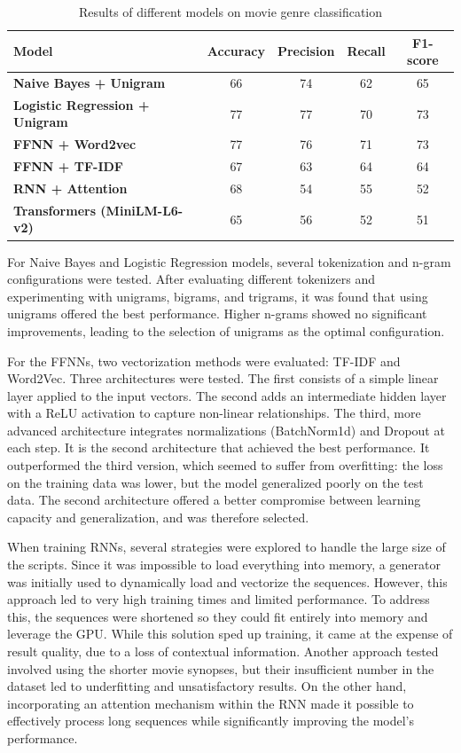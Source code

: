 \documentclass[12pt]{report}
\begin{document}
\begin{table}[H]
\centering
\begin{tabular}{|l|c|c|c|c|}
\hline
\textbf{Model} & \textbf{Accuracy} & \textbf{Precision} & \textbf{Recall} & \textbf{F1-score} \\
\hline
\textbf{Naive Bayes + Unigram}        & 66 & 74 & 62 & 65 \\
\textbf{Logistic Regression + Unigram} & 77 & 77 & 70 & 73 \\
\textbf{FFNN + Word2vec}                 & 77 & 76 & 71 & 73 \\
\textbf{FFNN + TF-IDF}                   & 67 & 63 & 64 & 64 \\
\textbf{RNN + Attention}                & 68 & 54 & 55 & 52 \\
\textbf{Transformers (MiniLM-L6-v2)}    & 65 & 56 & 52 & 51 \\
\hline
\end{tabular}
\caption{Results of different models on movie genre classification}
\label{tab:resultats_modeles}
\end{table}

For Naive Bayes and Logistic Regression models, several tokenization and n-gram configurations were tested. After evaluating different tokenizers and experimenting with unigrams, bigrams, and trigrams, it was found that using unigrams offered the best performance. Higher n-grams showed no significant improvements, leading to the selection of unigrams as the optimal configuration. 

For the FFNNs, two vectorization methods were evaluated: TF-IDF and Word2Vec. Three architectures were tested. The first consists of a simple linear layer applied to the input vectors. The second adds an intermediate hidden layer with a ReLU activation to capture non-linear relationships. The third, more advanced architecture integrates normalizations (BatchNorm1d) and Dropout at each step. It is the second architecture that achieved the best performance. It outperformed the third version, which seemed to suffer from overfitting: the loss on the training data was lower, but the model generalized poorly on the test data. The second architecture offered a better compromise between learning capacity and generalization, and was therefore selected. 

When training RNNs, several strategies were explored to handle the large size of the scripts. Since it was impossible to load everything into memory, a generator was initially used to dynamically load and vectorize the sequences. However, this approach led to very high training times and limited performance. To address this, the sequences were shortened so they could fit entirely into memory and leverage the GPU. While this solution sped up training, it came at the expense of result quality, due to a loss of contextual information. Another approach tested involved using the shorter movie synopses, but their insufficient number in the dataset led to underfitting and unsatisfactory results. On the other hand, incorporating an attention mechanism within the RNN made it possible to effectively process long sequences while significantly improving the model's performance. 
\end{document}

